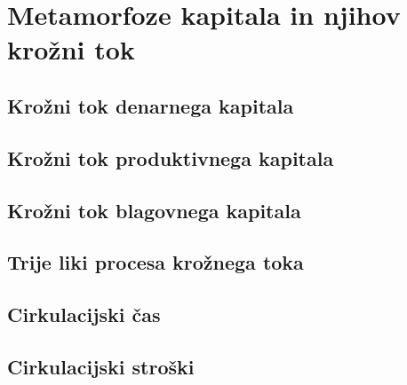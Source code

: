 \documentclass[egregdoesnotlikesansseriftitles, a5paper, BCOR=1cm, DIV=calc]{scrbook}
\begin{document}
% 

\part{Metamorfoze kapitala in njihov krožni tok}

    \chapter{Krožni tok denarnega kapitala}
    

    \chapter{Krožni tok produktivnega kapitala}

    \chapter{Krožni tok blagovnega kapitala}

    \chapter{Trije liki procesa krožnega toka}

    \chapter{Cirkulacijski čas}
    
    
    \chapter{Cirkulacijski stroški}
    



\end{document}
